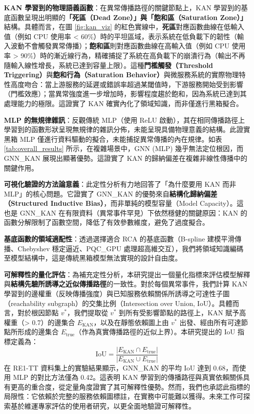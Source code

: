 \documentclass[10pt,a4paper,twocolumn]{article}
\begin{document}
\textbf{KAN 學習到的物理語義函數}：在異常傳播路徑的關鍵節點上，KAN 學習到的基底函數呈現出明顯的\textbf{「死區（Dead Zone）」與「飽和區（Saturation Zone）」}結構。具體而言，在圖 \ref{fig:kan_viz} 的紅色實線中，\textbf{死區}對應函數曲線在低輸入值（例如 CPU 使用率 < 60\%）時的平坦區域，表示系統在低負載下的韌性（輸入波動不會觸發異常傳播）；\textbf{飽和區}則對應函數曲線在高輸入值（例如 CPU 使用率 > 90\%）時的漸近線行為，精確捕捉了系統在高負載下的崩潰行為（輸出不再隨輸入線性增長，系統已達到容量上限）。這種\textbf{門檻觸發（Threshold Triggering）}與\textbf{飽和行為（Saturation Behavior）}與微服務系統的實際物理特性高度吻合：當上游服務的延遲或錯誤率超過某閾值時，下游服務開始受到影響（門檻效應）；當異常強度進一步增加時，影響程度趨於飽和，因為系統已達到其處理能力的極限。這證實了 KAN 確實內化了領域知識，而非僅進行黑箱擬合。

\textbf{MLP 的無規律雜訊}：反觀傳統 MLP（使用 ReLU 啟動），其在相同傳播路徑上學習到的函數形狀呈現無規律的雜訊分佈，未能呈現具備物理意義的結構。此證實黑箱 MLP 僅進行資料驅動的擬合，未能捕捉異常傳播的內在規律。如表 \ref{tab:overall_results} 所示，在複雜場景中，GNN (MLP) 幾乎無法定位根因，而 GNN\_KAN 展現出顯著優勢。這證實了 KAN 的歸納偏差在複雜非線性傳播中的關鍵作用。

\textbf{可視化驗證的方法論意義}：此定性分析有力地回答了「為什麼要用 KAN 而非 MLP」的核心問題。它證實了 GNN\_KAN 的優勢來自\textbf{結構化歸納偏差（Structured Inductive Bias）}，而非單純的模型容量（Model Capacity）。這也是 GNN\_KAN 在有限資料（異常事件罕見）下依然穩健的關鍵原因：KAN 的函數分解限制了函數空間，降低了有效參數維度，避免了過度擬合。

\textbf{基底函數的領域適配性}：透過選擇適合 RCA 的基底函數（B-spline 建模平滑傳播、Chebyshev 穩定逼近、PQC\_GPU 處理超高維交互），我們將領域知識編碼至模型結構中，這是傳統黑箱模型無法實現的設計自由度。

\textbf{可解釋性的量化評估}：為補充定性分析，本研究提出一個量化指標來評估模型解釋與\textbf{結構先驗所誘導之近似傳播路徑}的一致性。對於每個異常事件，我們計算 KAN 學習到的邊權重（反映傳播強度）與已知服務依賴關係所誘導之可達性子圖（reachability subgraph）的交集比例（Intersection over Union, IoU）。具體而言，對於根因節點 $v^*$，我們提取從 $v^*$ 到所有受影響節點的路徑上，KAN 賦予高權重（> 0.7）的邊集合 $E_{\text{KAN}}$，以及在靜態依賴圖上由 $v^*$ 出發、經由所有可達節點所形成的邊集合 $E_{\text{true}}$（作為真實傳播路徑的近似上界）。本研究提出的 IoU 指標定義為：
\begin{equation}
\text{IoU} = \frac{|E_{\text{KAN}} \cap E_{\text{true}}|}{|E_{\text{KAN}} \cup E_{\text{true}}|}
\end{equation}
在 RE1-TT 資料集上的實驗結果顯示，GNN\_KAN 的平均 IoU 達到 0.68，而使用 MLP 的對比方法僅為 0.42。這表明 KAN 學習到的傳播路徑與真實依賴關係具有更高的重合度，從定量角度證實了其可解釋性優勢。然而，我們也承認此指標的局限性：它依賴於完整的服務依賴圖標註，在實務中可能難以獲得。未來工作可探索基於維運專家評估的使用者研究，以更全面地驗證可解釋性。
\end{document}
